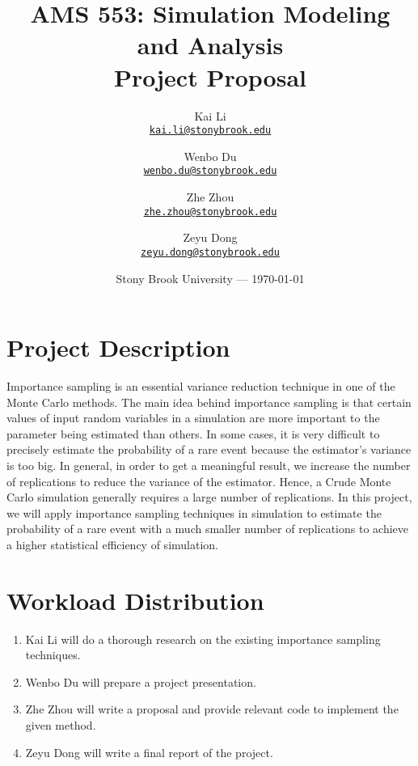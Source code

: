 \documentclass[11pt]{article}
\title{\textbf{AMS 553: Simulation Modeling and Analysis}\\Project Proposal}
\author{Kai Li\\\href{mailto:kai.li@stonybrook.edu}{\texttt{kai.li@stonybrook.edu}} \and Wenbo Du\\\href{mailto:wenbo.du@stonybrook.edu}{\texttt{wenbo.du@stonybrook.edu}} \and Zhe Zhou\\\href{mailto:zhe.zhou@stonybrook.edu}{\texttt{zhe.zhou@stonybrook.edu}} \and Zeyu Dong\\\href{mailto:zeyu.dong@stonybrook.edu}{\texttt{zeyu.dong@stonybrook.edu}}}
\date{Stony Brook University --- \today}
\begin{document}
\maketitle

\section{Project Description}

Importance sampling is an essential variance reduction technique in one of the Monte Carlo methods. The main idea behind importance sampling is that certain values of input random variables in a simulation are more important to the parameter being estimated than others. In some cases, it is very difficult to precisely estimate the probability of a rare event because the estimator's variance is too big. In general, in order to get a meaningful result, we increase the number of replications to reduce the variance of the estimator. Hence, a Crude Monte Carlo simulation generally requires a large number of replications. In this project, we will apply importance sampling techniques in simulation to estimate the probability of a rare event with a much smaller number of replications to achieve a higher statistical efficiency of simulation.

\section{Workload Distribution}
\begin{enumerate}
\item Kai Li will do a thorough research on the existing importance sampling techniques.
\item Wenbo Du will prepare a project presentation.
\item Zhe Zhou will write a proposal and provide relevant code to implement the given method.
\item Zeyu Dong will write a final report of the project.
\end{enumerate}
\end{document}
